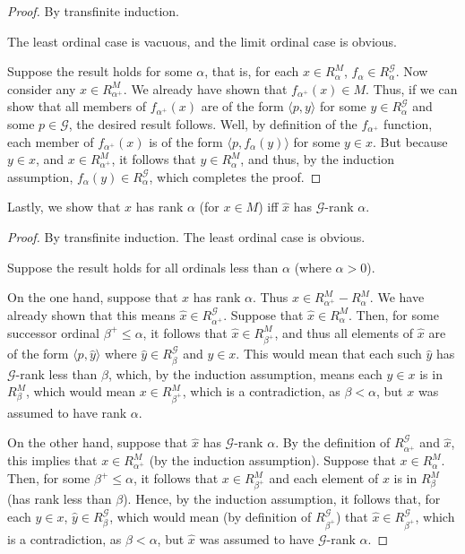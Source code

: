 \documentclass{article}
\theoremstyle{definition}
\begin{document}
\begin{proof}
By transfinite induction.

The least ordinal case is vacuous, and the limit ordinal case is obvious.

Suppose the result holds for some $\alpha$, that is, for 
each $x\in R^M_\alpha$, $f_\alpha\in R^\mathcal{G}_\alpha$. Now consider any 
$x\in R^M_{\alpha^+}$. We already have shown that $f_{\alpha^+}(x)\in M$. Thus, if we can 
show that all members of $f_{\alpha^+}(x)$ are of the form 
$\langle p,y\rangle$ for some $y\in R^\mathcal{G}_\alpha$ and some $p\in\mathcal{G}$, the desired result follows. Well, 
by definition of the $f_{\alpha^+}$ function, each member of $f_{\alpha^+}(x)$ is of the form 
$\langle p,f_\alpha(y)\rangle$ for some $y\in x$. But because $y\in x$, and $x\in R^M_{\alpha^+}$, it follows 
that $y\in R^M_\alpha$, and thus, by the induction assumption, $f_\alpha(y)\in R^\mathcal{G}_\alpha$, which 
completes the proof.

\end{proof} 

Lastly, we show that $x$ has rank $\alpha$ (for $x\in M$) iff $\hat{x}$ has $\mathcal{G}$-rank $\alpha$.

\begin{proof}
By transfinite induction.
The least ordinal case is obvious.

Suppose the result holds for all ordinals less than $\alpha$ (where $\alpha>0$).

On the one hand, suppose that $x$ has rank $\alpha$. 
Thus $x\in R^M_{\alpha^+}-R^M_\alpha$. We have already shown that this means $\hat{x}\in R^\mathcal{G}_{\alpha^+}$. 
Suppose that $\hat{x}\in R^M_\alpha$. Then, for some successor ordinal $\beta^+\le\alpha$, it follows that 
$\hat{x}\in R^M_{\beta^+}$, and thus all elements of $\hat{x}$ are of the form 
$\langle p,\hat{y}\rangle$ where $\hat{y}\in R^\mathcal{G}_\beta$ and $y\in x$. This would mean that each 
such $\hat{y}$ has $\mathcal{G}$-rank less than $\beta$, which, by the induction assumption, means each $y\in x$ is in 
$R^M_\beta$, which would mean $x\in R^M_{\beta^+}$, which is a contradiction, as $\beta<\alpha$, but 
$x$ was assumed to have rank $\alpha$.

On the other hand, suppose that $\hat{x}$ has $\mathcal{G}$-rank $\alpha$. By the definition of 
$R^\mathcal{G}_{\alpha^+}$ and $\hat{x}$, this implies that $x\in R^M_{\alpha^+}$ (by the induction assumption). Suppose 
that $x\in R^M_\alpha$. Then, for some $\beta^+\le\alpha$, it follows that $x\in R^M_{\beta^+}$ and 
each element of $x$ is in $R^M_\beta$ (has rank less than $\beta$). 
Hence, by the induction assumption, it follows that, for 
each $y\in x$, $\hat{y}\in R^\mathcal{G}_\beta$, which would mean (by definition of $R^\mathcal{G}_{\beta^+}$) that 
$\hat{x}\in R^\mathcal{G}_{\beta^+}$, which is a contradiction, as $\beta<\alpha$, but 
$\hat{x}$ was assumed to have $\mathcal{G}$-rank $\alpha$.

\end{proof}
\end{document}
